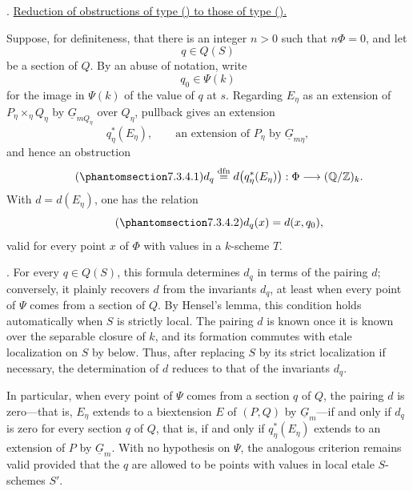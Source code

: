 
\medskip
\noindent {}.  \underline{Reduction of obstructions of type () to
those of type ().}

Suppose, for definiteness, that there is an integer $n>0$ such that
$n\Phi=0$, and let
\[
 q\in Q(S)
\]
be a section of $Q$.  By an abuse of notation, write
\[
 q_0\in\Psi(k)
\]
for the image in $\Psi(k)$ of the value of $q$ at $s$.  Regarding $E_\eta$
as an extension of $P_\eta\times_\eta Q_\eta$ by
$\underline G_{mQ_\eta}$ over $Q_\eta$, pullback gives an extension
\[
 q_\eta^*(E_\eta),\qquad
 \text{an extension of $P_\eta$ by $\underline G_{m\eta}$},
\]
and hence an obstruction
\begin{equation}\tag{\SGARefTarget{sga7.sga7i.eviii.n7-3-4-1}{7.3.4.1}}
 d_q\overset{\mathrm{dfn}}{=}
 d\bigl(q_\eta^*(E_\eta)\bigr):
 \Phi\longrightarrow(\mathbb Q/\mathbb Z)_k.
\end{equation}
With $d=d(E_\eta)$, one has the relation
\begin{equation}\tag{\SGARefTarget{sga7.sga7i.eviii.n7-3-4-2}{7.3.4.2}}
 d_q(x)=d(x,q_0),
\end{equation}
valid for every point $x$ of $\Phi$ with values in a $k$-scheme $T$.

\smallskip
\noindent {}.  For every $q\in Q(S)$, this formula determines $d_q$
in terms of the pairing $d$; conversely, it plainly recovers $d$ from the
invariants $d_q$, at least when every point of $\Psi$ comes from a section
of $Q$.  By Hensel's lemma, this condition holds automatically when $S$ is
strictly local.  The pairing $d$ is known once it is known over the
separable closure of $k$, and its formation commutes with etale localization
on $S$ by  below.  Thus, after replacing $S$ by its strict
localization if necessary, the determination of $d$ reduces to that of the
invariants $d_q$.

In particular, when every point of $\Psi$ comes from a section $q$ of $Q$,
the pairing $d$ is zero---that is, $E_\eta$ extends to a biextension $E$ of
$(P,Q)$ by $\underline G_m$---if and only if $d_q$ is zero for every
section $q$ of $Q$, that is, if and only if $q_\eta^*(E_\eta)$ extends to
an extension of $P$ by $\underline G_m$.  With no hypothesis on $\Psi$,
the analogous criterion remains valid provided that the $q$ are allowed to
be points with values in local etale $S$-schemes $S'$.

